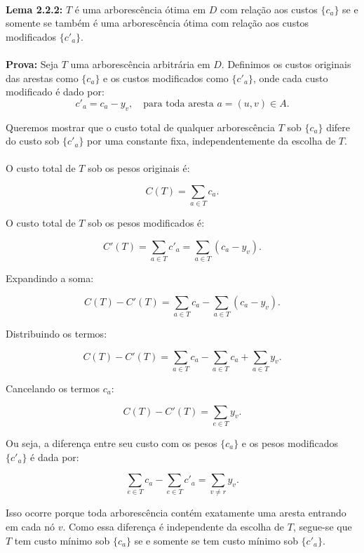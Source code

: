 \documentclass[12pt,a4paper]{article}
\begin{document}
\paragraph{}
\textbf{Lema 2.2.2:} \(T\) é uma arborescência ótima em \(D\) com relação aos custos \(\{c_a\}\) se e somente se também é uma arborescência ótima com relação aos custos modificados \(\{c'_a\}\).

\paragraph{}
\textbf{Prova:} 
Seja \( T \) uma arborescência arbitrária em \( D \). Definimos os custos originais das arestas como \( \{c_a\} \) e os custos modificados como \( \{c'_a\} \), onde cada custo modificado é dado por:
\[
c'_a = c_a - y_v, \quad \text{para toda aresta } a = (u, v) \in A.
\]

Queremos mostrar que o custo total de qualquer arborescência \( T \) sob \( \{c_a\} \) difere do custo sob \( \{c'_a\} \) por uma constante fixa, independentemente da escolha de \( T \).

\paragraph{}
O custo total de \( T \) sob os pesos originais é:

\[
C(T) = \sum_{a \in T} c_a.
\]

O custo total de \( T \) sob os pesos modificados é:

\[
C'(T) = \sum_{a \in T} c'_a = \sum_{a \in T} (c_a - y_v).
\]

Expandindo a soma:

\[
C(T) - C'(T) = \sum_{a \in T} c_a - \sum_{a \in T} (c_a - y_v).
\]

Distribuindo os termos:

\[
C(T) - C'(T) = \sum_{a \in T} c_a - \sum_{a \in T} c_a + \sum_{a \in T} y_v.
\]

Cancelando os termos \( c_a \):

\[
C(T) - C'(T) = \sum_{e \in T} y_v.
\]

Ou seja,  a diferença entre seu custo com os pesos \(\{c_a\}\) e os pesos modificados \(\{c'_a\}\) é dada por:

\[\sum_{e \in T} c_a - \sum_{e \in T} c'_a = \sum_{v \neq r} y_v.\]

Isso ocorre porque toda arborescência contém exatamente uma aresta entrando em cada nó \(v\). Como essa diferença é independente da escolha de \(T\), segue-se que \(T\) tem custo mínimo sob \(\{c_a\}\) se e somente se tem custo mínimo sob \(\{c'_a\}\).
\end{document}
